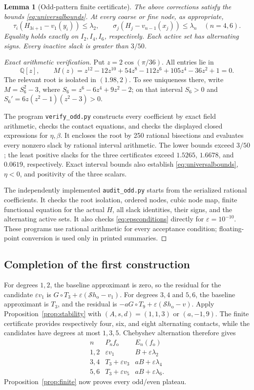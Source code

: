 \documentclass[11pt]{article}
\newtheorem{lemma}[theorem]{Lemma}
\theoremstyle{remark}\newtheorem{remark}[theorem]{Remark}
\newcommand{\Q}{\mathbb Q}
\newcommand{\eps}{\varepsilon}
\begin{document}
\begin{lemma}[Odd-pattern finite certificate]\label{lem:oddcertificate}
The above corrections satisfy the bounds \eqref{eq:universalbounds}.
At every coarse or fine node, as appropriate,
\[
 \tau_i(H_{3i+1}-v_1(y_i))\le\lambda_2,
 \qquad
 \sigma_j(H_j-v_{n-1}(x_j))\le\lambda_n\quad(n=4,6).
\]
Equality holds exactly on $I_2,I_4,I_6$, respectively. Each active set has
alternating signs. Every inactive slack is greater than $3/50$.
\end{lemma}
\begin{proof}[Exact arithmetic verification]
Put $z=2\cos(\pi/36)$. All entries lie in
\[
 \Q[z],\qquad
 M(z)=z^{12}-12z^{10}+54z^8-112z^6+105z^4-36z^2+1=0.
\]
The relevant root is isolated in $(1.98,2)$. To see uniqueness there, write
$M=S_6^2-3$, where $S_6=z^6-6z^4+9z^2-2$; on that interval
$S_6>0$ and $S_6'=6z(z^2-1)(z^2-3)>0$.

The program \texttt{verify\_odd.py} constructs every coefficient by exact
field arithmetic, checks the contact equations, and checks the displayed
closed expressions for $\eta,\beta$. It encloses the root by 250 rational
bisections and evaluates every nonzero slack by rational interval
arithmetic. The lower bounds exceed $3/50$; the least positive slacks for
the three certificates exceed $1.5265$, $1.6678$, and $0.0619$,
respectively. Exact interval bounds also establish
\eqref{eq:universalbounds}, $\eta<0$, and positivity of the three scalars.

The independently implemented \texttt{audit\_odd.py} starts from the
serialized rational coefficients. It checks the root isolation, ordered
nodes, cubic node map, finite functional equation for the actual $H$,
all slack identities, their signs, and the alternating active sets. It
also checks \eqref{eq:epsconditions} directly for $\eps=10^{-10}$.
These programs use rational arithmetic for every acceptance condition;
floating-point conversion is used only in printed summaries.
\end{proof}

\subsection{Completion of the first construction}

For degrees $1,2$, the baseline approximant is zero, so the residual for
the candidate $\eps v_1$ is
$G\circ T_3+\eps(\mathcal S h_{\mathrm{o}}-v_1)$.
For degrees $3,4$ and $5,6$, the baseline approximant is $T_3$, and the
residual is $-aG\circ T_9+\eps(\mathcal S h_{\mathrm{o}}-v)$.
Apply Proposition~\ref{prop:stability} with
$(A,s,d)=(1,1,3)$ or $(a,-1,9)$.
The finite certificate provides respectively four, six, and eight
alternating contacts, while the candidates have degrees at most $1,3,5$.
Chebyshev alternation therefore gives
\[
\begin{array}{c|c|c}
 n&P_n f_{\mathrm{o}}&E_n(f_{\mathrm{o}})\\\hline
 1,2&\eps v_1&B+\eps\lambda_2\\
 3,4&T_3+\eps v_3&aB+\eps\lambda_4\\
 5,6&T_3+\eps v_5&aB+\eps\lambda_6.
\end{array}
\]
Proposition~\ref{prop:finite} now proves every odd/even plateau.
\end{document}

